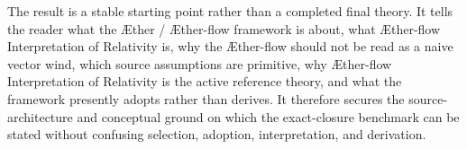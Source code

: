 \documentclass[11pt]{article}
\newcommand{\Aether}{\AE{}ther}
\newcommand{\Aflow}{\AE{}ther-flow}
\newcommand{\TheoryName}{\Aflow{} Interpretation of Relativity}
\newcommand{\TheoryProgram}{\Aether{} / \Aflow{} framework}
\begin{document}
The result is a stable starting point rather than a completed final theory. It
tells the reader what the \TheoryProgram{} is about, what \TheoryName{} is,
why the \Aflow{} should not be read as a naive vector wind, which source
assumptions are primitive, why \TheoryName{} is the active reference theory,
and what the framework presently adopts rather than derives. It therefore
secures the source-architecture and conceptual ground on which the
exact-closure benchmark can be stated without confusing selection, adoption,
interpretation, and derivation.


\end{document}
